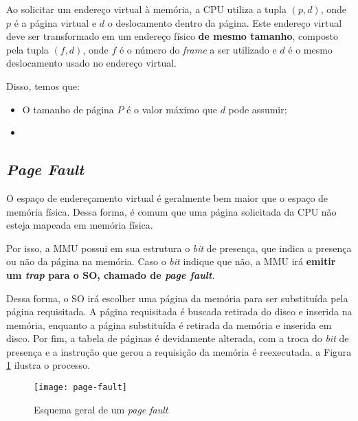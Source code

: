 Ao solicitar um endereço virtual à memória, a CPU utiliza a tupla $(p,d)$, onde $p$ é a página virtual e $d$ o deslocamento dentro da página. Este endereço virtual deve ser transformado em um endereço físico \textbf{de mesmo tamanho}, composto pela tupla $(f,d)$, onde $f$ é o número do \textit{frame} a ser utilizado e $d$ é o mesmo deslocamento usado no endereço virtual.

Disso, temos que:

\begin{itemize}
  \item O tamanho de página $P$ é o valor máximo que $d$ pode assumir;

  \item
\end{itemize}









\subsection{\textit{Page Fault}}
O espaço de endereçamento virtual é geralmente bem maior que o espaço de memória física. Dessa forma, é comum que uma página solicitada da CPU não esteja mapeada em memória física.

Por isso, a MMU possui em sua estrutura o \textit{bit} de presença, que indica a presença ou não da página na memória. Caso o \textit{bit} indique que não, a MMU irá \textbf{emitir um \textit{trap} para o SO, chamado de \textit{page fault}}.

Dessa forma, o SO irá escolher uma página da memória para ser substituída pela página requisitada. A página requisitada é buscada retirada do disco e inserida na memória, enquanto a página substituída é retirada da memória e inserida em disco. Por fim, a tabela de páginas é devidamente alterada, com a troca do \textit{bit} de presença e a instrução que gerou a requisição da memória é reexecutada. a Figura \ref{fig:page-fault} ilustra o processo.

\begin{figure}
  \centering
  \texttt{[image: page-fault]}
  \caption{Esquema geral de um \textit{page fault}}
  \label{fig:page-fault}
\end{figure}











